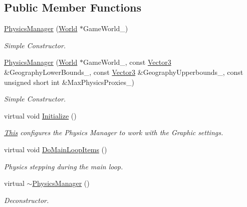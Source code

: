 \subsection*{Public Member Functions}
\begin{DoxyCompactItemize}
\item 
\hyperlink{classphys_1_1PhysicsManager_a3c78a0773d6a544aa6ea06b12ffc5fee}{PhysicsManager} (\hyperlink{classphys_1_1World}{World} $\ast$GameWorld\_\-)
\begin{DoxyCompactList}\small\item\em Simple Constructor. \item\end{DoxyCompactList}\item 
\hyperlink{classphys_1_1PhysicsManager_aa2c37564d35c3b7266219812ee43717f}{PhysicsManager} (\hyperlink{classphys_1_1World}{World} $\ast$GameWorld\_\-, const \hyperlink{classphys_1_1Vector3}{Vector3} \&GeographyLowerBounds\_\-, const \hyperlink{classphys_1_1Vector3}{Vector3} \&GeographyUpperbounds\_\-, const unsigned short int \&MaxPhysicsProxies\_\-)
\begin{DoxyCompactList}\small\item\em Simple Constructor. \item\end{DoxyCompactList}\item 
virtual void \hyperlink{classphys_1_1PhysicsManager_a28885be750bb763d957f122593815388}{Initialize} ()
\begin{DoxyCompactList}\small\item\em \hyperlink{structThis}{This} configures the Physics Manager to work with the Graphic settings. \item\end{DoxyCompactList}\item 
virtual void \hyperlink{classphys_1_1PhysicsManager_a62741a2582ac9bfd0255cf8a3ad2310c}{DoMainLoopItems} ()
\begin{DoxyCompactList}\small\item\em Physics stepping during the main loop. \item\end{DoxyCompactList}\item 
virtual \hyperlink{classphys_1_1PhysicsManager_a4898702f889c6b4aa7c0b59991d310b0}{$\sim$PhysicsManager} ()
\begin{DoxyCompactList}\small\item\em Deconstructor. \item\end{DoxyCompactList}\item 

\end{DoxyCompactItemize}
